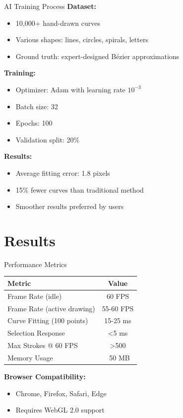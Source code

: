 \documentclass{beamer}
\begin{document}
\begin{frame}{AI Training Process}
\textbf{Dataset:}
\begin{itemize}
    \item 10,000+ hand-drawn curves
    \item Various shapes: lines, circles, spirals, letters
    \item Ground truth: expert-designed Bézier approximations
\end{itemize}

\vspace{1em}

\textbf{Training:}
\begin{itemize}
    \item Optimizer: Adam with learning rate $10^{-3}$
    \item Batch size: 32
    \item Epochs: 100
    \item Validation split: 20\%
\end{itemize}

\vspace{1em}

\textbf{Results:}
\begin{itemize}
    \item Average fitting error: 1.8 pixels
    \item 15\% fewer curves than traditional method
    \item Smoother results preferred by users
\end{itemize}
\end{frame}

\section{Results}

\begin{frame}{Performance Metrics}
\begin{table}
\centering
\begin{tabular}{|l|c|}
\hline
\textbf{Metric} & \textbf{Value} \\
\hline
Frame Rate (idle) & 60 FPS \\
Frame Rate (active drawing) & 55-60 FPS \\
Curve Fitting (100 points) & 15-25 ms \\
Selection Response & <5 ms \\
Max Strokes @ 60 FPS & >500 \\
Memory Usage & ~50 MB \\
\hline
\end{tabular}
\end{table}

\vspace{1em}

\textbf{Browser Compatibility:}
\begin{itemize}
    \item Chrome, Firefox, Safari, Edge
    \item Requires WebGL 2.0 support
\end{itemize}
\end{frame}
\end{document}
